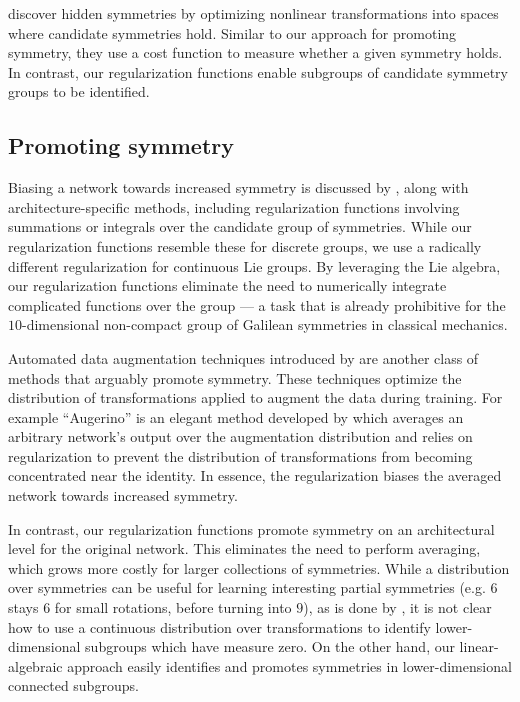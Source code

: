 \documentclass[twoside,11pt]{article}
\begin{document}
\cite{Liu2022hidden} discover hidden symmetries by optimizing nonlinear transformations into spaces where candidate symmetries hold. 
Similar to our approach for promoting symmetry, they use a cost function to measure whether a given symmetry holds. 
In contrast, our regularization functions enable subgroups of candidate symmetry groups to be identified.


\subsection{Promoting symmetry}

Biasing a network towards increased symmetry is discussed by \cite{Wang2022approximately}, along with architecture-specific methods, including regularization functions involving summations or integrals over the candidate group of symmetries.
While our regularization functions resemble these for discrete groups, we use a radically different regularization for continuous Lie groups.
By leveraging the Lie algebra, our regularization functions eliminate the need to numerically integrate complicated functions over the group --- a task that is already prohibitive for the $10$-dimensional non-compact group of Galilean symmetries in classical mechanics.

Automated data augmentation techniques introduced by \cite{Cubuk2019autoaugment, Hataya2020faster, Benton2020learning} are another class of methods that arguably promote symmetry.
These techniques optimize the distribution of transformations applied to augment the data during training. 
For example ``Augerino'' is an elegant method developed by \cite{Benton2020learning} which averages an arbitrary network's output over the augmentation distribution and relies on regularization to prevent the distribution of transformations from becoming concentrated near the identity. 
In essence, the regularization biases the averaged network towards increased symmetry.

In contrast, our regularization functions promote symmetry on an architectural level for the original network. 
This eliminates the need to perform averaging, which grows more costly for larger collections of symmetries. 
While a distribution over symmetries can be useful for learning interesting partial symmetries (e.g. $6$ stays $6$ for small rotations, before turning into $9$), as is done by \cite{Benton2020learning}, it is not clear how to use a continuous distribution over transformations to identify lower-dimensional subgroups which have measure zero. 
On the other hand, our linear-algebraic approach easily identifies and promotes symmetries in lower-dimensional connected subgroups.
\end{document}

